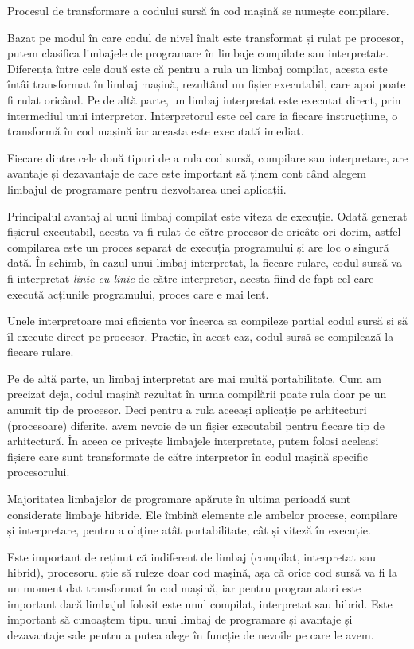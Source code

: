 Procesul de transformare a codului sursă în cod mașină se numește compilare.

Bazat pe modul în care codul de nivel înalt este transformat și rulat pe
procesor, putem clasifica limbajele de programare în limbaje compilate sau
interpretate. Diferența între cele două este că pentru a rula un limbaj
compilat, acesta este întâi transformat în limbaj mașină, rezultând un fișier
executabil, care apoi poate fi rulat oricând. Pe de altă parte, un limbaj
interpretat este executat direct, prin intermediul unui interpretor.
Interpretorul este cel care ia fiecare instrucțiune, o transformă în cod mașină
iar aceasta este executată imediat.

Fiecare dintre cele două tipuri de a rula cod sursă, compilare sau interpretare,
are avantaje și dezavantaje de care este important să ținem cont când alegem
limbajul de programare pentru dezvoltarea unei aplicații.

Principalul avantaj al unui limbaj compilat este viteza de execuție. Odată
generat fișierul executabil, acesta va fi rulat de către procesor de oricâte ori
dorim, astfel compilarea este un proces separat de execuția programului și are
loc o singură dată. În schimb, în cazul unui limbaj interpretat, la fiecare
rulare, codul sursă va fi interpretat \textit{linie cu linie} de către
interpretor, acesta fiind de fapt cel care execută acțiunile programului, proces
care e mai lent.

Unele interpretoare mai eficienta vor încerca sa compileze parțial codul sursă
și să îl execute direct pe procesor. Practic, în acest caz, codul sursă se
compilează la fiecare rulare.

Pe de altă parte, un limbaj interpretat are mai multă portabilitate. Cum am
precizat deja, codul mașină rezultat în urma compilării poate rula doar pe un
anumit tip de procesor. Deci pentru a rula aceeași aplicație pe arhitecturi
(procesoare) diferite, avem nevoie de un fișier executabil pentru fiecare tip de
arhitectură. În aceea ce privește limbajele interpretate, putem folosi aceleași
fișiere care sunt transformate de către interpretor în codul mașină specific
procesorului.

Majoritatea limbajelor de programare apărute în ultima perioadă sunt considerate
limbaje hibride. Ele îmbină elemente ale ambelor procese, compilare și
interpretare, pentru a obține atât portabilitate, cât și viteză în execuție.

Este important de reținut că indiferent de limbaj (compilat, interpretat sau
hibrid), procesorul știe să ruleze doar cod mașină, așa că orice cod sursă va fi
la un moment dat transformat în cod mașină, iar pentru programatori este
important dacă limbajul folosit este unul compilat, interpretat sau hibrid. Este
important să cunoaștem tipul unui limbaj de programare și avantaje și
dezavantaje sale pentru a putea alege în funcție de nevoile pe care le avem.

